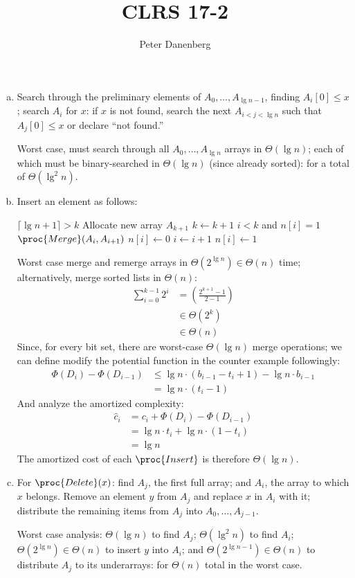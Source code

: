 \documentclass{article}
\author{Peter Danenberg}
\title{CLRS 17-2}
\begin{document}
\maketitle

\begin{enumerate}[a.]
\item Search through the preliminary elements of $A_0, \dots, A_{\lg
  n - 1}$, finding $A_i[0] \leq x$; search $A_i$ for $x$: if $x$ is not
  found, search the next $A_{i < j < \lg n}$ such that $A_j[0] \leq x$
  or declare ``not found.''

  Worst case, must search through all $A_0, \dots, A_{\lg n}$ arrays
  in $\Theta(\lg n)$; each of which must be binary-searched in
  $\Theta(\lg n)$ (since already sorted): for a total of $\Theta(\lg^2
  n)$.
\item Insert an element as follows:
  \begin{codebox}
    \li \If $\lceil\lg{n+1}\rceil > k$
    \li \Then
    Allocate new array $A_{k+1}$
    \li $k \gets k+1$
    \End
    \li \While $i < k$ and $n[i] = 1$
    \li \Do
    $\proc{Merge}(A_i, A_{i+1})$
    \li $n[i] \gets 0$
    \li $i \gets i + 1$
    \End
    \li $n[i] \gets 1$
  \end{codebox}
  Worst case merge and remerge arrays in $\Theta(2^{\lg n}) \in
  \Theta(n)$ time; alternatively, merge sorted lists in $\Theta(n)$:
  \begin{align}
    \sum_{i=0}^{k-1}2^i &= \left(\frac{2^{k+1} - 1}{2-1}\right)\\
    &\in \Theta(2^k)\\
    &\in \Theta(n)
  \end{align}
  Since, for every bit set, there are worst-case $\Theta(\lg n)$ merge
  operations; we can define modify the potential function in the
  counter example followingly:
  \begin{align}
    \Phi(D_i)-\Phi(D_{i-1}) &\leq \lg n\cdot(b_{i-1}-t_i+1) - \lg n\cdot b_{i-1}\\
    &= \lg n\cdot(t_i - 1)
  \end{align}
  And analyze the amortized complexity:
  \begin{align}
    \hat{c}_i &= c_i + \Phi(D_i) - \Phi(D_{i-1})\\
    &= \lg n \cdot t_i + \lg n\cdot(1 - t_i)\\
    &= \lg n
  \end{align}
  The amortized cost of each $\proc{Insert}$ is therefore $\Theta(\lg n)$.
\item For $\proc{Delete}(x)$: find $A_j$, the first full array; and
  $A_i$, the array to which $x$ belongs. Remove an element $y$ from
  $A_j$ and replace $x$ in $A_i$ with it; distribute the remaining
  items from $A_j$ into $A_0, \dots, A_{j-1}$.

  Worst case analysis: $\Theta(\lg n)$ to find $A_j$; $\Theta(\lg^2
  n)$ to find $A_i$; $\Theta(2^{\lg n}) \in \Theta(n)$ to insert $y$
  into $A_i$; and $\Theta(2^{\lg n - 1}) \in \Theta(n)$ to distribute
  $A_j$ to its underarrays: for $\Theta(n)$ total in the worst case.
\end{enumerate}
\end{document}

